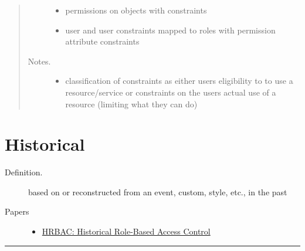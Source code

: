 \documentclass[letterpaper,10pt,english]{sphinxmanual}
\begin{document}
\begin{quote}
\begin{description}
\begin{itemize}
\item {} 
permissions on objects with constraints

\item {} 
user and user constraints mapped to roles with permission attribute constraints

\end{itemize}

\item[{Notes.}] \leavevmode\begin{itemize}
\item {} 
classification of constraints as either users eligibility to to use a resource/service or constraints on the users actual use of a resource (limiting what they can do)

\end{itemize}

\end{description}
\end{quote}


\chapter{Historical}
\label{categories/historical::doc}\label{categories/historical:historical}\begin{description}
\item[{Definition.}] \leavevmode
based on or reconstructed from an event, custom, style, etc., in the past

\item[{Papers}] \leavevmode\begin{itemize}
\item {} 
\href{http://citeseerx.ist.psu.edu/viewdoc/download?doi=10.1.1.182.8833\&rep=rep1\&type=pdf}{HRBAC: Historical Role-Based Access Control}

\end{itemize}

\end{description}


\bigskip\hrule{}\bigskip
\end{document}
